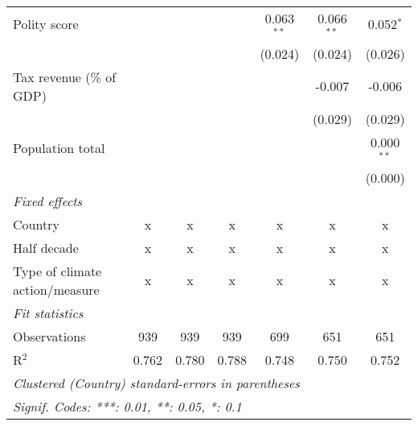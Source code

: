 \begin{tabular}{lcccccc}
   Polity score                                                         &         &                &                & 0.063$^{**}$   & 0.066$^{**}$   & 0.052$^{*}$\\   
                                                                        &         &                &                & (0.024)        & (0.024)        & (0.026)\\   
   Tax revenue (\% of GDP)                                              &         &                &                &                & -0.007         & -0.006\\   
                                                                        &         &                &                &                & (0.029)        & (0.029)\\   
   Population total                                                     &         &                &                &                &                & 0.000$^{**}$\\   
                                                                        &         &                &                &                &                & (0.000)\\   
   \emph{Fixed effects}\\
   Country                                                              & x       & x              & x              & x              & x              & x\\  
   Half decade                                                          & x       & x              & x              & x              & x              & x\\  
   Type of climate action/measure                                       & x       & x              & x              & x              & x              & x\\  
   \midrule \emph{Fit statistics}\\
   Observations                                                         & 939     & 939            & 939            & 699            & 651            & 651\\  
   R$^2$                                                                & 0.762   & 0.780          & 0.788          & 0.748          & 0.750          & 0.752\\  
   \midrule
   \multicolumn{7}{l}{\emph{Clustered (Country) standard-errors in parentheses}}\\
   \multicolumn{7}{l}{\emph{Signif. Codes: ***: 0.01, **: 0.05, *: 0.1}}\\
\end{tabular}
\par\endgroup


